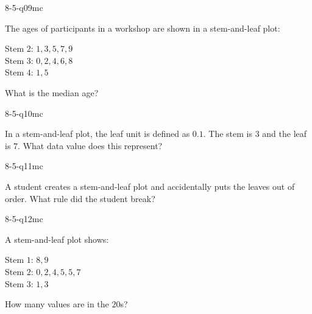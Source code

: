 \begin{practiceQuestion}{8-5-q09}{mc}
\begin{questionText}
The ages of participants in a workshop are shown in a stem-and-leaf plot:

Stem $2$: $1, 3, 5, 7, 9$\\
Stem $3$: $0, 2, 4, 6, 8$\\
Stem $4$: $1, 5$

What is the median age?
\end{questionText}
\end{practiceQuestion}

\begin{practiceQuestion}{8-5-q10}{mc}
\begin{questionText}
In a stem-and-leaf plot, the leaf unit is defined as $0.1$. The stem is $3$ and the leaf is $7$. What data value does this represent?
\end{questionText}
\end{practiceQuestion}

\begin{practiceQuestion}{8-5-q11}{mc}
\begin{questionText}
A student creates a stem-and-leaf plot and accidentally puts the leaves out of order. What rule did the student break?
\end{questionText}
\end{practiceQuestion}

\begin{practiceQuestion}{8-5-q12}{mc}
\begin{questionText}
A stem-and-leaf plot shows:

Stem $1$: $8, 9$\\
Stem $2$: $0, 2, 4, 5, 5, 7$\\
Stem $3$: $1, 3$

How many values are in the $20$s?
\end{questionText}
\end{practiceQuestion}

